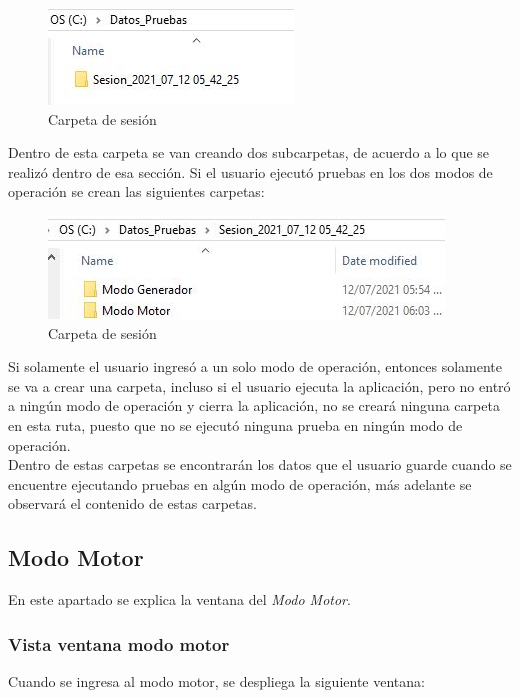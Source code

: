 \documentclass[12pt,titlepage]{article}
\begin{document}
\begin{figure}[htbp]
\hspace*{5.8cm} 
\includegraphics[scale=0.78]{Carpeta}
\caption{Carpeta de sesión}
\end{figure}

Dentro de esta carpeta se van creando dos subcarpetas, de acuerdo a lo que se realizó dentro de esa sección. Si el usuario ejecutó pruebas en los dos modos de operación se crean las siguientes carpetas: \\
\begin{figure}[htbp]
\hspace*{4.8cm} 
\includegraphics[scale=0.78]{Carpetas}
\caption{Carpeta de sesión}
\end{figure}

Si solamente el usuario  ingresó a un solo modo de operación, entonces solamente se va a crear una carpeta, incluso si el usuario ejecuta la aplicación, pero no entró a ningún modo de operación y cierra la aplicación, no se creará ninguna carpeta en esta ruta, puesto que no se ejecutó ninguna prueba en ningún modo de operación. \\ 

Dentro de estas carpetas se encontrarán los datos que el usuario guarde cuando se encuentre ejecutando  pruebas en algún modo de operación, más adelante se observará el contenido de estas carpetas. \\
\newpage
\subsection{Modo Motor}
En este apartado se explica la ventana del \textit{Modo Motor}.
\subsubsection{Vista ventana modo motor}
Cuando se ingresa al modo motor, se despliega la siguiente ventana: \\ 
\end{document}
